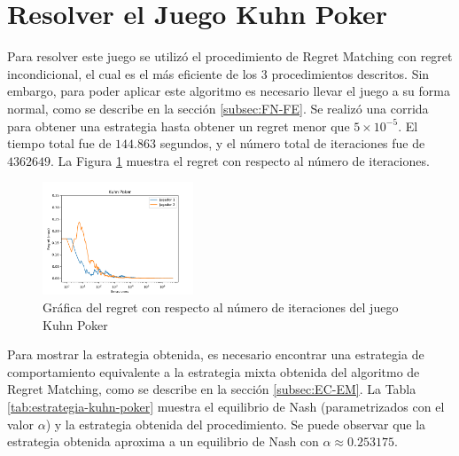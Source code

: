 \section{Resolver el Juego Kuhn Poker}

Para resolver este juego se utilizó el procedimiento de Regret Matching con regret incondicional, el cual es el más eficiente de los $3$ procedimientos descritos. Sin embargo, para poder aplicar este algoritmo es necesario llevar el juego a su forma normal, como se describe en la sección \ref{subsec:FN-FE}. Se realizó una corrida para obtener una estrategia hasta obtener un regret menor que $5 {\times} 10^{-5}$. El tiempo total fue de $144.863$ segundos, y el número total de iteraciones fue de $4362649$. La Figura \ref{fig:regret-kuhn-poker} muestra el regret con respecto al número de iteraciones.

\begin{figure}[ht]
\caption{Gráfica del regret con respecto al número de iteraciones del juego Kuhn Poker}
\label{fig:regret-kuhn-poker}
\centering
\includegraphics[width=0.4\textwidth]{graficas/kuhn-poker/grafica-kuhn-poker.png}
\end{figure}

Para mostrar la estrategia obtenida, es necesario encontrar una estrategia de comportamiento equivalente a la estrategia mixta obtenida del algoritmo de Regret Matching, como se describe en la sección \ref{subsec:EC-EM}. La Tabla \ref{tab:estrategia-kuhn-poker} muestra el equilibrio de Nash (parametrizados con el valor $\alpha$) y la estrategia obtenida del procedimiento. Se puede observar que la estrategia obtenida aproxima a un equilibrio de Nash con $\alpha \approx 0.253175$.

